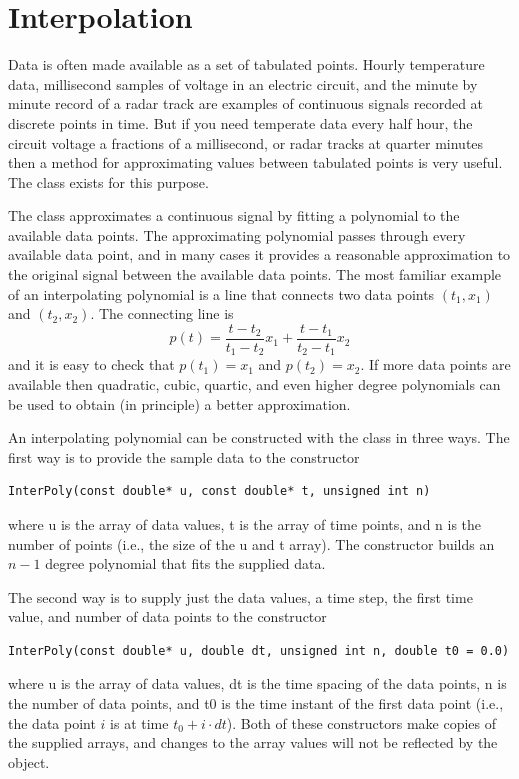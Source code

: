 \chapter{Interpolation}
Data is often made available as a set of tabulated points. Hourly temperature data, millisecond samples of voltage in an electric circuit, and the minute by minute record of a radar track are examples of continuous signals recorded at discrete points in time. But if you need temperate data every half hour, the circuit voltage a fractions of a millisecond, or radar tracks at quarter minutes then a method for approximating values between tabulated points is very useful. The  class exists for this purpose.

The  class approximates a continuous signal by fitting a polynomial to the available data points. The approximating polynomial passes through every available data point, and in many cases it provides a reasonable approximation to the original signal between the available data points. The most familiar example of an interpolating polynomial is a line that connects two data points $(t_1,x_1)$ and $(t_2,x_2)$. The connecting line is
\begin{equation*}
p(t)=\frac{t-t_2}{t_1-t_2}x_1 + \frac{t-t_1}{t_2-t_1}x_2
\end{equation*}
and it is easy to check that $p(t_1)=x_1$ and $p(t_2)=x_2$. If more data points are available then quadratic, cubic, quartic, and even higher degree polynomials can be used to obtain (in principle) a better approximation.

An interpolating polynomial can be constructed with the  class in three ways. The first way is to provide the sample data to the  constructor
\begin{verbatim}
InterPoly(const double* u, const double* t, unsigned int n)
\end{verbatim}
where u is the array of data values, t is the array of time points, and n is the number of points (i.e., the size of the u and t array). The constructor builds an $n-1$ degree polynomial that fits the supplied data.

The second way is to supply just the data values, a time step, the first time value, and number of data points to the constructor
\begin{verbatim}
InterPoly(const double* u, double dt, unsigned int n, double t0 = 0.0)
\end{verbatim}
where u is the array of data values, dt is the time spacing of the data points, n is the number of data points, and t0 is the time instant of the first data point (i.e., the data point $i$ is at time $t_0+i \cdot dt$). Both of these constructors make copies of the supplied arrays, and changes to the array values will not be reflected by the  object.


